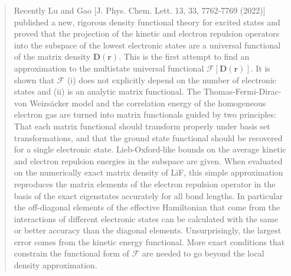 \documentclass[journal=jpclcd,manuscript=letter]{achemso}
\newcommand\m[1]{\mathbf{#1}}
\renewcommand\vec[1]{\mathbf{#1}}
\begin{document}
\begin{abstract}
Recently Lu and Gao [J. Phys. Chem. Lett. 13, 33, 7762-7769 (2022)]
published a new, rigorous density functional theory for excited states and proved that the
projection of the kinetic and electron repulsion operators into the subspace of the lowest electronic states
are a universal functional of the matrix density $\m{D}(\vec{r})$.
This is the first attempt to find an approximation to the multistate universal functional $\m{\mathcal{F}}[\m{D}(\vec{r})]$.
It is shown that $\m{\mathcal{F}}$ (i) does not explicitly depend on the number of electronic states and (ii)
is an analytic matrix functional. 
The Thomas-Fermi-Dirac-von Weizs\"{a}cker model and the correlation energy of the homogeneous electron gas
are turned into matrix functionals guided by two principles: That each matrix functional should transform
properly under basis set transformations, and that the ground state functional should be recovered for a single electronic state.
Lieb-Oxford-like bounds on the average kinetic and electron repulsion energies in the subspace are given.
When evaluated on the numerically exact matrix density of LiF, this simple approximation
reproduces the matrix elements of the electron repulsion operator in the basis of the exact eigenstates accurately for all bond lengths.
In particular the off-diagonal elements of the effective Hamiltonian that come from the
interactions of different electronic states can be calculated with the same or better accuracy than the diagonal elements.
Unsurprisingly, the largest error comes from the kinetic energy functional.
More exact conditions that constrain the functional form of $\m{\mathcal{F}}$ are needed to go beyond the local density approximation.
\end{abstract}

\end{document}
